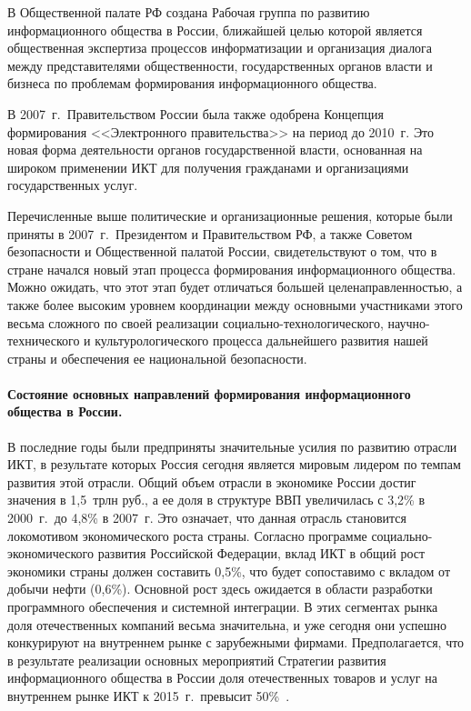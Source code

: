 \begin{multicols}{2}
     В Общественной палате РФ создана Рабочая группа по развитию информационного
общества в России, ближайшей целью которой является общественная экспертиза
процессов информатизации и организация диалога между представителями
общественности, государственных органов власти и бизнеса по проблемам формирования
информационного общества.

     В 2007~г.\ Правительством России была также одобрена Концепция формирования
<<Электронного правительства>> на период до 2010~г. Это новая форма деятельности
органов государственной влас\-ти, основанная на широком применении ИКТ для получения
гражданами и организациями государственных услуг.

     Перечисленные выше политические и организационные решения, которые были
приняты в 2007~г.\ Президентом и Правительством РФ, а также Советом безопасности и
Общественной палатой России, свидетельствуют о том, что в стране начался новый этап
процесса формирования информационного общества. Можно ожидать, что этот этап будет
отличаться большей целенаправленностью, а также более высоким уровнем координации
между основными участниками этого весьма сложного по своей реализации 
социально-тех\-но\-ло\-ги\-че\-ско\-го, научно-технического и культурологического процесса дальнейшего
развития нашей страны и обеспечения ее национальной безопасности.

\vspace*{-3pt}
\paragraph*{Состояние основных направлений формирования
информационного общества в России.} В последние годы были предприняты
значительные усилия по развитию отрасли ИКТ, в результате которых Россия 
сегодня является мировым лидером по темпам развития этой отрасли. Общий объем 
отрасли в экономике России достиг значения в 1,5~трлн руб., а ее доля в 
структуре ВВП увеличилась с 3,2\% в 2000~г.\ до 4,8\% в 2007~г. Это означает, 
что данная отрасль становится локомотивом экономического роста страны. Согласно 
программе социально-эко\-но\-ми\-че\-ско\-го развития Российской Федерации, 
вклад ИКТ в общий рост экономики страны должен составить 0,5\%, что будет 
сопоставимо с вкладом от добычи нефти (0,6\%). Основной рост здесь ожидается в 
области разработки про\-грам\-мно\-го обеспечения и системной интеграции. В 
этих сегментах рынка доля отечественных компаний весьма значительна, и уже 
сегодня они успешно конкурируют на внут\-рен\-нем рынке с зарубежными фирмами. 
Предполагается, что в результате реализации основных мероприятий Стратегии 
развития информационного общества в России доля отечественных товаров и услуг 
на внутреннем рынке ИКТ к 2015~г.\ превысит 50\%~\cite{2ss}.


\end{multicols}
